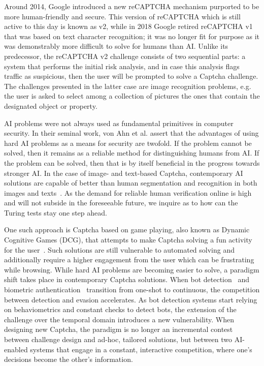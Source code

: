 Around 2014, Google introduced a new reCAPTCHA mechanism purported to be more human-friendly and secure.
This version of reCAPTCHA which is still active to this day is known as v2, while in 2018 Google retired reCAPTCHA v1 that was based on text character recognition; it was no longer fit for purpose as it was demonstrably more difficult to solve for humans than AI.
Unlike its predecessor, the reCAPTCHA v2 challenge consists of two sequential parts: a system that performs the initial risk analysis, and in case this analysis flags traffic as suspicious, then the user will be prompted to solve a Captcha challenge.
The challenges presented in the latter case are image recognition problems, e.g. the user is asked to select among a collection of pictures the ones that contain the designated object or property.

AI problems were not always used as fundamental primitives in computer security.
In their seminal work, von Ahn et al. \cite{von2003captcha} assert that the advantages of using hard AI problems as a means for security are twofold.
If the problem cannot be solved, then it remains as a reliable method for distinguishing humans from AI.
If the problem can be solved, then that is by itself beneficial in the progress towards stronger AI.
In the case of image- and text-based Captcha, contemporary AI solutions are capable of better than human segmentation and recognition in both images and texts~\cite{bursztein2014end, sivakorn2016robot, karpathy2015deep}.
As the demand for reliable human verification online is high and will not subside in the foreseeable future, we inquire as to how can the Turing tests stay one step ahead.

One such approach is Captcha based on game playing, also known as Dynamic Cognitive Games (DCG), that attempts to make Captcha solving a fun activity for the user~\cite{mohamed2014three}.
Such solutions are still vulnerable to automated solving and additionally require a higher engagement from the user which can be frustrating while browsing.
While hard AI problems are becoming easier to solve, a paradigm shift takes place in contemporary Captcha solutions. 
When bot detection~\cite{d2014avatar} and biometric authentication~\cite{fridman2015multi} transition from one-shot to continuous, the competition between detection and evasion accelerates.
As bot detection systems start relying on behaviometrics and constant checks to detect bots, the extension of the challenge over the temporal domain introduces a new vulnerability.
When designing new Captcha, the paradigm is no longer an incremental contest between challenge design and ad-hoc, tailored solutions, but between two AI-enabled systems that engage in a constant, interactive competition, where one's decisions become the other's information.

